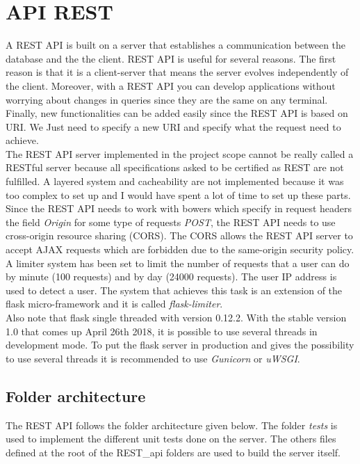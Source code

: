 \section{API REST}
A REST API is built on a server that establishes a communication between the database and the the client. REST API is useful for several reasons. The first reason is that it is a client-server that means the server evolves independently of the client. Moreover, with a REST API you can develop applications without worrying about changes in queries since they are the same on any terminal. Finally, new functionalities can be added easily since the REST API is based on URI. We Just need to specify a new URI and specify what the request need to achieve.\\

The REST API server implemented in the project scope cannot be really called a RESTful server because all specifications asked to be certified as REST are not fulfilled. A layered system and cacheability are not implemented because it was too complex to set up and I would have spent a lot of time to set up these parts.\\

Since the REST API needs to work with bowers which specify in request headers the field \textit{Origin} for some type of requests \textit{POST}, the REST API needs to use cross-origin resource sharing (CORS). The CORS allows the REST API server to accept AJAX requests which are forbidden due to the same-origin security policy.\\

A limiter system has been set to limit the number of requests that a user can do by minute (100 requests) and by day (24000 requests). The user IP address is used to detect a user. The system that achieves this task is an extension of the flask micro-framework and it is called \textit{flask-limiter}.\\

Also note that flask single threaded with version 0.12.2. With the stable version 1.0 that comes up April 26th 2018, it is possible to use several threads in development mode. To put the flask server in production and gives the possibility to use several threads it is recommended to use \textit{Gunicorn} or \textit{uWSGI}.
\subsection{Folder architecture}
The REST API follows the folder architecture given below. The folder \textit{tests} is used to implement the different unit tests done on the server. The others files defined at the root of the REST\_api folders are used to build the server itself.

